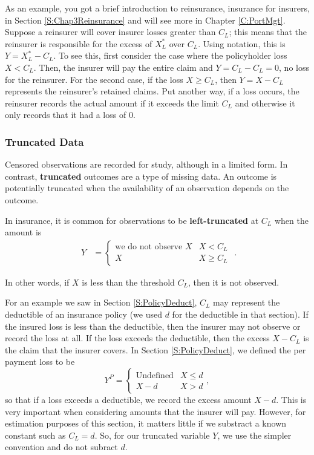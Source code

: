 \documentclass[]{book}
\theoremstyle{definition}
\theoremstyle{definition}
\theoremstyle{definition}
\theoremstyle{remark}
\begin{document}
As an example, you got a brief introduction to reinsurance, insurance
for insurers, in Section \ref{S:Chap3Reinsurance} and will see more in
Chapter \ref{C:PortMgt}. Suppose a reinsurer will cover insurer losses
greater than \(C_L\); this means that the reinsurer is responsible for
the excess of \(X_L^{\ast}\) over \(C_L\). Using notation, this is
\(Y = X_L^{\ast} - C_L\). To see this, first consider the case where the
policyholder loss \(X < C_L\). Then, the insurer will pay the entire
claim and \(Y =C_L- C_L=0\), no loss for the reinsurer. For the second
case, if the loss \(X \ge C_L\), then \(Y = X-C_L\) represents the
reinsurer's retained claims. Put another way, if a loss occurs, the
reinsurer records the actual amount if it exceeds the limit \(C_L\) and
otherwise it only records that it had a loss of \(0\).

\subsubsection{Truncated Data}\label{truncated-data}

Censored observations are recorded for study, although in a limited
form. In contrast, \textbf{truncated} outcomes are a type of missing
data. An outcome is potentially truncated when the availability of an
observation depends on the outcome.

In insurance, it is common for observations to be
\textbf{left-truncated} at \(C_L\) when the amount is \[
\begin{aligned}
Y &=
\left\{
\begin{array}{cl}
\text{we do not observe }X & X < C_L \\
X & X \geq C_L
\end{array}
\right.\end{aligned} .
\]

In other words, if \(X\) is less than the threshold \(C_L\), then it is
not observed.

For an example we saw in Section \ref{S:PolicyDeduct}, \(C_L\) may
represent the deductible of an insurance policy (we used \(d\) for the
deductible in that section). If the insured loss is less than the
deductible, then the insurer may not observe or record the loss at all.
If the loss exceeds the deductible, then the excess \(X-C_L\) is the
claim that the insurer covers. In Section \ref{S:PolicyDeduct}, we
defined the per payment loss to be \[
Y^{P} = \left\{ \begin{matrix}
\text{Undefined} & X \le d \\
X - d & X > d 
\end{matrix} \right. ,
\] so that if a loss exceeds a deductible, we record the excess amount
\(X-d\). This is very important when considering amounts that the
insurer will pay. However, for estimation purposes of this section, it
matters little if we substract a known constant such as \(C_L=d\). So,
for our truncated variable \(Y\), we use the simpler convention and do
not subract \(d\).
\end{document}
